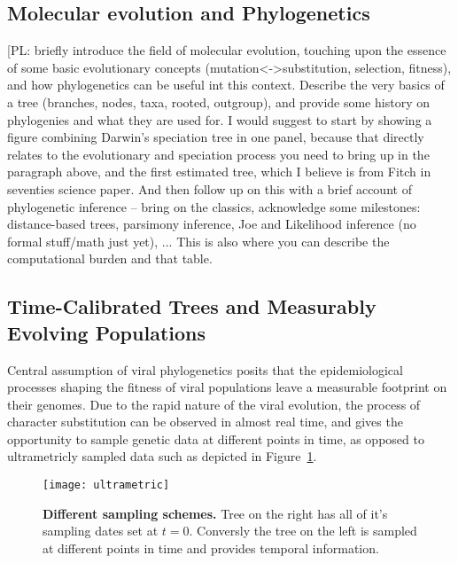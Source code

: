 \subsection{Molecular evolution and Phylogenetics}

[PL: briefly introduce the field of molecular evolution, touching upon the essence of some basic evolutionary concepts (mutation<->substitution, selection, fitness), and how phylogenetics can be useful int this context. 
Describe the very basics of a tree (branches, nodes, taxa, rooted, outgroup), and provide some history on phylogenies and what they are used for. I would suggest to start by showing a figure combining Darwin's speciation tree in one panel, because that directly relates to the evolutionary and speciation process you need to bring up in the paragraph above, and the first estimated tree, which I believe is from Fitch in seventies science paper.
And then follow up on this with a brief account of phylogenetic inference -- bring on the classics, acknowledge some milestones: distance-based trees, parsimony inference, Joe and Likelihood inference (no formal stuff/math just yet), ...
This is also where you can describe the computational burden and that table.



\subsection{Time-Calibrated Trees and Measurably Evolving Populations}


Central assumption of viral phylogenetics posits that the epidemiological processes shaping the fitness of viral populations leave a measurable footprint on their genomes.
Due to the rapid nature of the viral evolution, the process of character substitution can be observed in almost real time, and gives the opportunity to sample genetic data at different points in time, as opposed to ultrametricly sampled data such as depicted in Figure~\ref{fig:ultrametric}.

\begin{figure}[H]
\centering
\texttt{[image: ultrametric]} 
\caption{
{ \footnotesize 
{\bf Different sampling schemes.} Tree on the right has all of it's sampling dates set at $t=0$. Conversly the tree on the left is sampled at different points in time and provides temporal information.
}%
}
\label{fig:ultrametric}
\end{figure}

